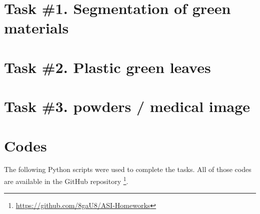 \section{Task \#1. Segmentation of green materials}






\section{Task \#2. Plastic green leaves}





\section{Task \#3. powders / medical image}

% 


\section{Codes}
The following Python scripts were used to complete the tasks. All of
those codes are available in the GitHub repository
\footnote{\url{https://github.com/8gaU8/ASI-Homeworks}}.











